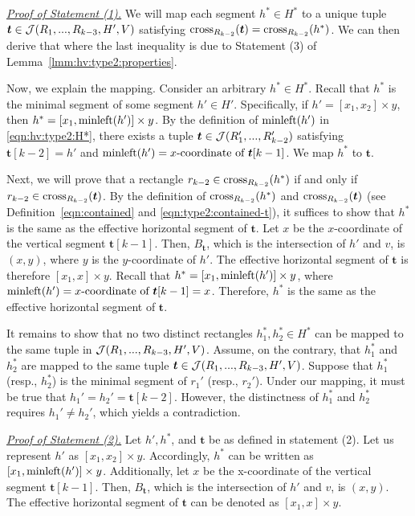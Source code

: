 \noindent \underline{\em Proof of Statement (1).} We will map each segment $h^* \in H^*$ to a unique tuple $\textrm{\boldmath${t}$}\in \mathcal{J}(R_1,...,R_{k-3},H',V)$ satisfying $\mathrm{cross}_{R_{k-2}}(\textrm{\boldmath${t}$}) = \mathrm{cross}_{R_{k-2}}(h^*)$. We can then derive that 
 where the last inequality is due to Statement (3) of Lemma~\ref{lmm:hv:type2:properties}.

\vgap 

Now, we explain the mapping. Consider an arbitrary $h^* \in H^*$. Recall that $h^*$ is the minimal segment of some segment $h' \in H'$. Specifically, if $h' = [x_1,x_2]\times y$, then $h^* = [x_1,\mathrm{minleft}(h')]\times y$. By the definition of $\mathrm{minleft}(h')$ in \eqref{eqn:hv:type2:H*}, there exists a tuple $\textrm{\boldmath${t}$}\in \mathcal{J}(R_1',...,R_{k-2}')$ satisfying $\bm{t}[k-2] = h'$ and $\mathrm{minleft}(h') = \text{$x$-coordinate of $\textrm{\boldmath${t}$}[k-1]$}$. We map $h^*$ to $\bm{t}$.

\vgap

Next, we will prove that a rectangle $r_{k-2} \in \mathrm{cross}_{R_{k-2}}(h^*)$ if and only if $r_{k-2} \in \mathrm{cross}_{R_{k-2}}(\textrm{\boldmath${t}$})$. By the definition of $\mathrm{cross}_{R_{k-2}}(h^*)$ and $\mathrm{cross}_{R_{k-2}}(\textrm{\boldmath${t}$})$ (see Definition~\eqref{eqn:contained} and \eqref{eqn:type2:contained-t}), it suffices to show that $h^*$ is the same as the effective horizontal segment of $\bm{t}$. Let $x$ be the $x$-coordinate of the vertical segment $\bm{t}[k-1]$. Then, $B_\bm{t}$, which is the intersection of $h'$ and $v$, is $(x,y)$, where $y$ is the $y$-coordinate of $h'$. The effective horizontal segment of $\bm{t}$ is therefore $[x_1,x]\times y$. Recall that $h^* = [x_1,\mathrm{minleft}(h')]\times y$, where $\mathrm{minleft}(h') = \text{$x$-coordinate of $\textrm{\boldmath${t}$}[k-1]$} = x$. Therefore, $h^*$ is the same as the effective horizontal segment of $\bm{t}$.



It remains to show that no two distinct rectangles $h_1^*, h_2^* \in H^*$ can be mapped to the same tuple in $\mathcal{J}(R_1,...,R_{k-3}, H',V)$. Assume, on the contrary, that $h_1^*$ and $h_2^*$ are mapped to the same tuple $\textrm{\boldmath${t}$}\in \mathcal{J}(R_1,...,R_{k-3}, H',V)$. Suppose that $h_1^*$ (resp., $h_2^*$) is the minimal segment of $r_1'$ (resp., $r_2'$). Under our mapping, it must be true that  $h_1' = h_2' = \bm{t}[k-2]$. However, the distinctness of $h_1^*$ and $h_2^*$ requires $h_1' \ne h_2'$, which yields a contradiction.

\extraspacing \underline{\em Proof of Statement (2).}
Let $h', h^*$, and $\bm{t}$ be as defined in statement (2). Let us represent $h'$ as $[x_1,x_2] \times y$. Accordingly, $h^*$ can be written as $[x_1, \mathrm{minleft}(h')] \times y$. Additionally, let $x$ be the x-coordinate of the vertical segment $\bm{t}[k-1]$. Then, $B_\bm{t}$, which is the intersection of $h'$ and $v$, is $(x,y)$. The effective horizontal segment of $\bm{t}$ can be denoted as $[x_1,x] \times y$. 

